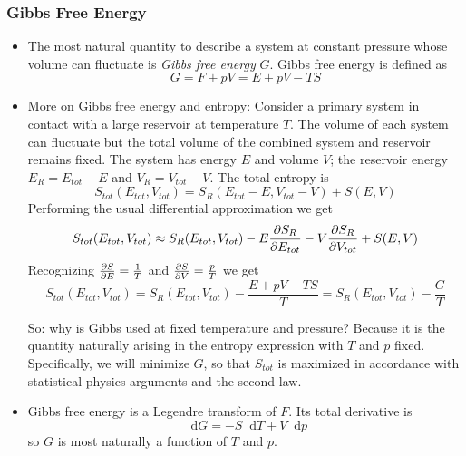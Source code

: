 \documentclass[11pt, a4paper]{article}
\newcommand{\diff}{\mathop{}\!\mathrm{d}} %
\begin{document}
\subsubsection{Gibbs Free Energy}
\begin{itemize}
	\item The most natural quantity to describe a system at constant pressure whose volume can fluctuate is \textit{Gibbs free energy} $ G $. Gibbs free energy is defined as
	\begin{equation*}
		G = F + pV = E + pV - TS
	\end{equation*}
	
	\item More on Gibbs free energy and entropy: Consider a primary system in contact with a large reservoir at temperature $ T $. The volume of each system can fluctuate but the total volume of the combined system and reservoir remains fixed. The system has energy $ E $ and volume  $ V $; the reservoir energy $ E_{R} = E_{tot} - E $ and $ V_{R} = V_{tot} - V $. The total entropy is
	\begin{equation*}
		S_{tot}(E_{tot}, V_{tot}) = S_{R}(E_{tot} - E, V_{tot} - V) + S(E, V)
	\end{equation*}
	Performing the usual differential approximation we get
	\begin{equation*}
		S_{tot}(E_{tot}, V_{tot}) \approx S_{R}(E_{tot}, V_{tot}) - E\pdv{S_{R}}{E_{tot}} - V\pdv{S_{R}}{V_{tot}} + S(E, V)
	\end{equation*}
	Recognizing $ \pdv{S}{E} = \frac{1}{T}  $ and $ \pdv{S}{V} = \frac{p}{T} $ we get
	\begin{equation*}
		S_{tot}(E_{tot}, V_{tot}) = S_{R}(E_{tot}, V_{tot}) - \frac{E + pV - TS}{T} = S_{R}(E_{tot}, V_{tot}) - \frac{G}{T}
	\end{equation*}
	
	So: why is Gibbs used at fixed temperature and pressure? Because it is the quantity naturally arising in the entropy expression with $ T $ and $ p $ fixed. Specifically, we will minimize $ G $, so that $ S_{tot} $ is maximized in accordance with statistical physics arguments and the second law.
	
	
	\item Gibbs free energy is a Legendre transform of $ F $. Its total derivative is
	\begin{equation*}
		\diff G = - S \diff T + V \diff p
	\end{equation*}
	so $ G $ is most naturally a function of $ T $ and $ p $.
	

\end{itemize}
\end{document}
